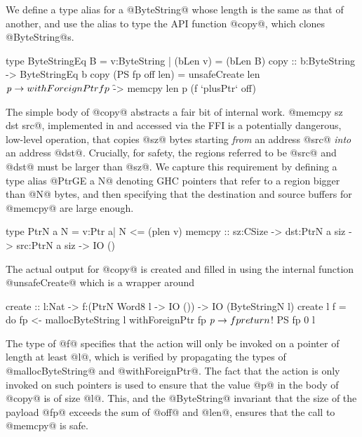 We define a type alias for a @ByteString@ whose length is the same
as that of another, and use the alias to type the API 
function @copy@, which clones @ByteString@s.

\begin{code}
type ByteStringEq B 
  = {v:ByteString | (bLen v) = (bLen B)}
copy :: b:ByteString -> ByteStringEq b 
copy (PS fp off len) 
  = unsafeCreate len $ \mathit{p} -> 
      withForeignPtr fp $ \f ->
        memcpy len p (f `plusPtr` off) 
\end{code}

The simple body of @copy@ abstracts a fair bit of internal work. 
@memcpy sz dst src@, implemented in \C and accessed via the FFI is a potentially
dangerous, low-level operation, that copies @sz@ bytes starting
\emph{from} an address @src@ \emph{into} an address @dst@. 
Crucially, for safety, the regions referred to be @src@ and @dst@ 
must be larger than @sz@. We capture this requirement by defining
a type alias @PtrGE a N@ denoting GHC pointers that refer to a region
bigger than @N@ bytes, and then specifying that the destination
and source buffers for @memcpy@ are large enough.

\begin{code}
type PtrN a N = {v:Ptr a| N <= (plen v)}
memcpy :: sz:CSize -> dst:PtrN a siz 
                   -> src:PtrN a siz 
                   -> IO () 
\end{code}

The actual output for @copy@ is created and filled in using the 
internal function @unsafeCreate@ which is a wrapper around %

\begin{code}
create :: l:Nat -> f:(PtrN Word8 l -> IO ())
       -> IO (ByteStringN l)
create l f = do
    fp <- mallocByteString l
    withForeignPtr fp $ \mathit{p} -> f p
    return $! PS fp 0 l
\end{code}

%
The type of @f@ specifies that the action
will only be invoked on a pointer of length at least 
@l@, which is verified by propagating the types of
@mallocByteString@ and @withForeignPtr@. 
%
The fact that the action is only invoked on such pointers 
is used to ensure that the value @p@ in the body of @copy@ 
is of size @l@. This, and the @ByteString@ 
invariant that the size of the payload @fp@ 
exceeds the sum of @off@ and @len@, ensures 
that the call to @memcpy@ is safe.

